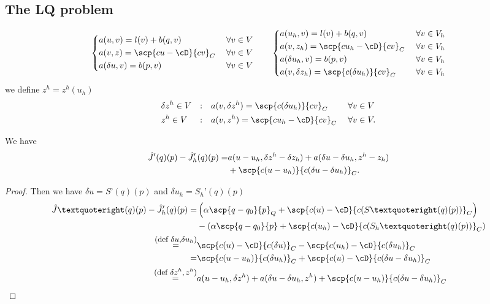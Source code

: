 \subsection{The LQ problem}\label{subsec:}
%
%
\begin{align*}
%
\left\{
\begin{aligned}
&a(u,v) = l(v)+b(q,v)&\; \forall v\in V\\
&a(v, z) = \scp{cu-\cD}{cv}_C&\; \forall v\in V\\
&a(\delta u,v) = b(p,v)&\; \forall v\in V\\
\end{aligned}
\right.
%
\qquad
%
\left\{
\begin{aligned}
&a(u_h,v) = l(v)+b(q,v)&\; \forall v\in V_h\\
&a(v, z_h) = \scp{cu_h-\cD}{cv}_C&\; \forall v\in V_h\\
&a(\delta u_h,v) = b(p,v)&\; \forall v\in V_h\\
&a(v,\delta z_h) = \scp{c(\delta u_h)}{cv}_C&\; \forall v\in V_h
\end{aligned}
\right.
%
\end{align*}
%
we define $z^h=z^h(u_h)$
%
\begin{alignat*}{3}
&\delta z^h\in V&:&\quad a(v,\delta z^h) = \scp{c(\delta u_h)}{cv}_C\; &\forall& v\in V\\
&z^h\in V&:&\quad a(v, z^h) = \scp{cu_h-\cD}{cv}_C\; &\forall& v\in V.
\end{alignat*}
%
\begin{theorem}\label{thm:}
We have
%
\begin{equation}\label{eq:ErrorGradRepLQ}
\begin{split}
\hat J'(q)(p) - \hat J_h'(q)(p) =& a(u-u_h,\delta z^{h}-\delta z_h) + a(\delta u-\delta u_h,z^h-z_h)\\
&+\scp{c(u-u_h)}{c(\delta u-\delta u_h)}_C.
\end{split}
\end{equation}
%
\end{theorem}
%
\begin{proof}
Then we have ${\delta u = S’(q)(p)}$ and ${\delta u_h = S_h’(q)(p)}$
%
\begin{align*}
\hat J’(q)(p) - \hat J'_h(q)(p) =& \left( \alpha\scp{q-q_0}{p}_Q + \scp{c(u)-\cD}{c(S’(q)(p))}_C\right)\\ 
&- \left( \alpha\scp{q-q_0}{p} + \scp{c(u_h)-\cD}{c(S_h’(q)(p))}_C\right)\\ 
\stackrel{\mbox{\small(def $\delta u$,$\delta u_h$)}}{=}&\scp{c(u)-\cD}{c(\delta u)}_C - \scp{c(u_h)-\cD}{c(\delta u_h)}_C\\
\stackrel{\mbox{}}{=}& \scp{c(u-u_h)}{c(\delta u_h)}_C + \scp{c(u)-\cD}{c(\delta u-\delta u_h)}_C\\
\stackrel{\mbox{\small(def $\delta z^h, z^h$)}}{=}& a(u-u_h,\delta z^{h}) + a(\delta u-\delta u_h,z^h)+\scp{c(u-u_h)}{c(\delta u-\delta u_h)}_C 
\end{align*}
%
\end{proof}
